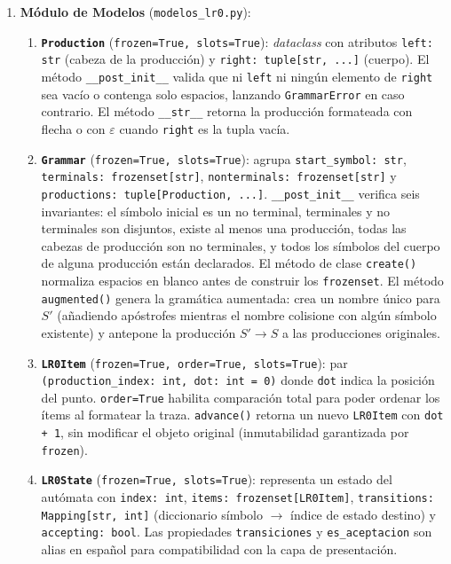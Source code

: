 \begin{enumerate}
  \item \textbf{Módulo de Modelos} (\texttt{modelos\_lr0.py}):

    \begin{enumerate}[label=\alph*.]
      \item \textbf{\texttt{Production}} (\texttt{frozen=True, slots=True}):
        \textit{dataclass} con atributos \texttt{left: str} (cabeza de la producción) y
        \texttt{right: tuple[str, ...]} (cuerpo). El método \texttt{\_\_post\_init\_\_}
        valida que ni \texttt{left} ni ningún elemento de \texttt{right} sea vacío o
        contenga solo espacios, lanzando \texttt{GrammarError} en caso contrario.
        El método \texttt{\_\_str\_\_} retorna la producción formateada con flecha o con
        $\varepsilon$ cuando \texttt{right} es la tupla vacía.

      \item \textbf{\texttt{Grammar}} (\texttt{frozen=True, slots=True}):
        agrupa \texttt{start\_symbol: str}, \texttt{terminals: frozenset[str]},
        \texttt{nonterminals: frozenset[str]} y \texttt{productions: tuple[Production, ...]}.
        \texttt{\_\_post\_init\_\_} verifica seis invariantes: el símbolo inicial es un
        no terminal, terminales y no terminales son disjuntos, existe al menos una
        producción, todas las cabezas de producción son no terminales, y todos los
        símbolos del cuerpo de alguna producción están declarados.
        El método de clase \texttt{create()} normaliza espacios en blanco antes de
        construir los \texttt{frozenset}.
        El método \texttt{augmented()} genera la gramática aumentada: crea un nombre
        único para $S'$ (añadiendo apóstrofes mientras el nombre colisione con algún
        símbolo existente) y antepone la producción $S' \to S$ a las producciones
        originales.

      \item \textbf{\texttt{LR0Item}} (\texttt{frozen=True, order=True, slots=True}):
        par \texttt{(production\_index: int, dot: int = 0)} donde \texttt{dot} indica
        la posición del punto. \texttt{order=True} habilita comparación total para
        poder ordenar los ítems al formatear la traza.
        \texttt{advance()} retorna un nuevo \texttt{LR0Item} con \texttt{dot + 1},
        sin modificar el objeto original (inmutabilidad garantizada por \texttt{frozen}).

      \item \textbf{\texttt{LR0State}} (\texttt{frozen=True, slots=True}):
        representa un estado del autómata con \texttt{index: int},
        \texttt{items: frozenset[LR0Item]},
        \texttt{transitions: Mapping[str, int]} (diccionario símbolo $\to$ índice de
        estado destino) y \texttt{accepting: bool}.
        Las propiedades \texttt{transiciones} y \texttt{es\_aceptacion} son alias en
        español para compatibilidad con la capa de presentación.


\end{enumerate}
\end{enumerate}
